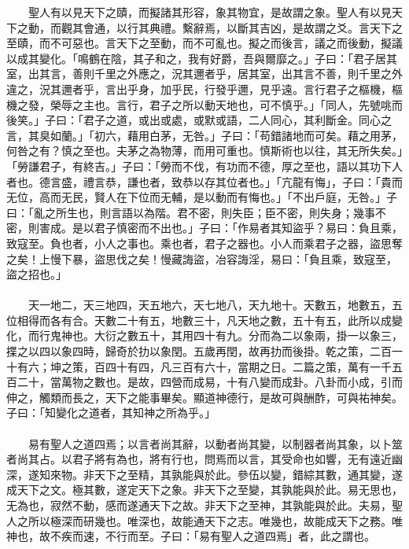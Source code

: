　　聖人有以見天下之賾，而擬諸其形容，象其物宜，是故謂之象。聖人有以見天下之動，而觀其會通，以行其典禮。繫辭焉，以斷其吉凶，是故謂之爻。言天下之至賾，而不可惡也。言天下之至動，而不可亂也。擬之而後言，議之而後動，擬議以成其變化。「鳴鶴在陰，其子和之，我有好爵，吾與爾靡之。」子曰：「君子居其室，出其言，善則千里之外應之，況其邇者乎，居其室，出其言不善，則千里之外違之，況其邇者乎，言出乎身，加乎民，行發乎邇，見乎遠。言行君子之樞機，樞機之發，榮辱之主也。言行，君子之所以動天地也，可不慎乎。」「同人，先號咷而後笑。」子曰：「君子之道，或出或處，或默或語，二人同心，其利斷金。同心之言，其臭如蘭。」「初六，藉用白茅，无咎。」子曰：「苟錯諸地而可矣。藉之用茅，何咎之有？慎之至也。夫茅之為物薄，而用可重也。慎斯術也以往，其无所失矣。」「勞謙君子，有終吉。」子曰：「勞而不伐，有功而不德，厚之至也，語以其功下人者也。德言盛，禮言恭，謙也者，致恭以存其位者也。」「亢龍有悔」，子曰：「貴而无位，高而无民，賢人在下位而无輔，是以動而有悔也。」「不出戶庭，无咎。」子曰：「亂之所生也，則言語以為階。君不密，則失臣；臣不密，則失身；幾事不密，則害成。是以君子慎密而不出也。」子曰：「作易者其知盜乎？易曰：負且乘，致寇至。負也者，小人之事也。乘也者，君子之器也。小人而乘君子之器，盜思奪之矣！上慢下暴，盜思伐之矣！慢藏誨盜，冶容誨淫，易曰：「負且乘，致寇至，盜之招也。」
\\\\
　　天一地二，天三地四，天五地六，天七地八，天九地十。天數五，地數五，五位相得而各有合。天數二十有五，地數三十，凡天地之數，五十有五，此所以成變化，而行鬼神也。大衍之數五十，其用四十有九。分而為二以象兩，掛一以象三，揲之以四以象四時，歸奇於扐以象閏。五歲再閏，故再扐而後掛。乾之策，二百一十有六；坤之策，百四十有四，凡三百有六十，當期之日。二篇之策，萬有一千五百二十，當萬物之數也。是故，四營而成易，十有八變而成卦。八卦而小成，引而伸之，觸類而長之，天下之能事畢矣。顯道神德行，是故可與酬酢，可與祐神矣。子曰：「知變化之道者，其知神之所為乎。」
\\\\
　　易有聖人之道四焉；以言者尚其辭，以動者尚其變，以制器者尚其象，以卜筮者尚其占。以君子將有為也，將有行也，問焉而以言，其受命也如響，无有遠近幽深，遂知來物。非天下之至精，其孰能與於此。參伍以變，錯綜其數，通其變，遂成天下之文。極其數，遂定天下之象。非天下之至變，其孰能與於此。易无思也，无為也，寂然不動，感而遂通天下之故。非天下之至神，其孰能與於此。夫易，聖人之所以極深而研幾也。唯深也，故能通天下之志。唯幾也，故能成天下之務。唯神也，故不疾而速，不行而至。子曰：「易有聖人之道四焉」者，此之謂也。
\\\\
